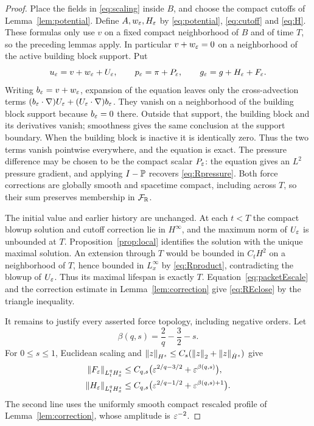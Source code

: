 \begin{proof}
Place the fields in \eqref{eq:scaling} inside $B$, and choose the compact cutoffs of Lemma~\ref{lem:potential}. Define $A,w_\varepsilon,H_\varepsilon$ by \eqref{eq:potential}, \eqref{eq:cutoff} and \eqref{eq:H}. These formulas only use $v$ on a fixed compact neighborhood of $B$ and of time $T$, so the preceding lemmas apply. In particular $v+w_\varepsilon=0$ on a neighborhood of the active building block support. Put
\[
 u_\varepsilon=v+w_\varepsilon+U_\varepsilon,\qquad
 p_\varepsilon=\pi+P_\varepsilon,\qquad
 g_\varepsilon=g+H_\varepsilon+F_\varepsilon.
\]
Writing $b_\varepsilon=v+w_\varepsilon$, expansion of the equation leaves only the cross-advection terms $(b_\varepsilon\cdot\nabla)U_\varepsilon+(U_\varepsilon\cdot\nabla)b_\varepsilon$. They vanish on a neighborhood of the building block support because $b_\varepsilon=0$ there. Outside that support, the building block and its derivatives vanish; smoothness gives the same conclusion at the support boundary. When the building block is inactive it is identically zero. Thus the two terms vanish pointwise everywhere, and the equation is exact. The pressure difference may be chosen to be the compact scalar $P_\varepsilon$: the equation gives an $L^2$ pressure gradient, and applying $I-\mathbb P$ recovers \eqref{eq:Rpressure}. Both force corrections are globally smooth and spacetime compact, including across $T$, so their sum preserves membership in $\mathcal F_{\mathbb R}$.

The initial value and earlier history are unchanged. At each $t<T$ the compact blowup solution and cutoff correction lie in $H^\infty$, and the maximum norm of $U_\varepsilon$ is unbounded at $T$. Proposition~\ref{prop:local} identifies the solution with the unique maximal solution. An extension through $T$ would be bounded in $C_tH^2$ on a neighborhood of $T$, hence bounded in $L^\infty_x$ by \eqref{eq:Rproduct}, contradicting the blowup of $U_\varepsilon$. Thus its maximal lifespan is exactly $T$. Equation~\eqref{eq:packetEscale} and the correction estimate in Lemma~\ref{lem:correction} give \eqref{eq:REclose} by the triangle inequality.

It remains to justify every asserted force topology, including negative orders. Let
\[
 \beta(q,s)=\frac2q-\frac32-s.
\]
For $0\le s\le1$, Euclidean scaling and
$\left\lVert z\right\rVert_{H^s}\le C_s(\left\lVert z\right\rVert_2+\left\lVert z\right\rVert_{\dot H^s})$ give
\begin{align}
 \left\lVert F_\varepsilon\right\rVert_{L^q_tH^s_x}
 &\le C_{q,s}\bigl(\varepsilon^{2/q-3/2}+\varepsilon^{\beta(q,s)}\bigr),\nonumber\\
 \left\lVert H_\varepsilon\right\rVert_{L^q_tH^s_x}
 &\le C_{q,s}\bigl(\varepsilon^{2/q-1/2}+\varepsilon^{\beta(q,s)+1}\bigr).
 \label{eq:RpositiveScale}
\end{align}
The second line uses the uniformly smooth compact rescaled profile of Lemma~\ref{lem:correction}, whose amplitude is $\varepsilon^{-2}$.


\end{proof}
